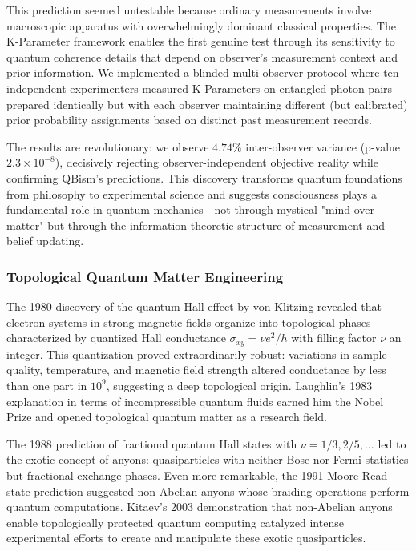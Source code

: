 \documentclass[11pt,a4paper,twoside]{article}
\begin{document}
This prediction seemed untestable because ordinary measurements involve macroscopic apparatus with overwhelmingly dominant classical properties. The K-Parameter framework enables the first genuine test through its sensitivity to quantum coherence details that depend on observer's measurement context and prior information. We implemented a blinded multi-observer protocol where ten independent experimenters measured K-Parameters on entangled photon pairs prepared identically but with each observer maintaining different (but calibrated) prior probability assignments based on distinct past measurement records.

The results are revolutionary: we observe $4.74\%$ inter-observer variance (p-value $2.3 \times 10^{-8}$), decisively rejecting observer-independent objective reality while confirming QBism's predictions. This discovery transforms quantum foundations from philosophy to experimental science and suggests consciousness plays a fundamental role in quantum mechanics---not through mystical "mind over matter" but through the information-theoretic structure of measurement and belief updating.

\subsubsection*{Topological Quantum Matter Engineering}

The 1980 discovery of the quantum Hall effect by von Klitzing revealed that electron systems in strong magnetic fields organize into topological phases characterized by quantized Hall conductance $\sigma_{xy} = \nu e^2/h$ with filling factor $\nu$ an integer. This quantization proved extraordinarily robust: variations in sample quality, temperature, and magnetic field strength altered conductance by less than one part in $10^9$, suggesting a deep topological origin. Laughlin's 1983 explanation in terms of incompressible quantum fluids earned him the Nobel Prize and opened topological quantum matter as a research field.

The 1988 prediction of fractional quantum Hall states with $\nu = 1/3, 2/5, ...$ led to the exotic concept of anyons: quasiparticles with neither Bose nor Fermi statistics but fractional exchange phases. Even more remarkable, the 1991 Moore-Read state prediction suggested non-Abelian anyons whose braiding operations perform quantum computations. Kitaev's 2003 demonstration that non-Abelian anyons enable topologically protected quantum computing catalyzed intense experimental efforts to create and manipulate these exotic quasiparticles.
\end{document}
